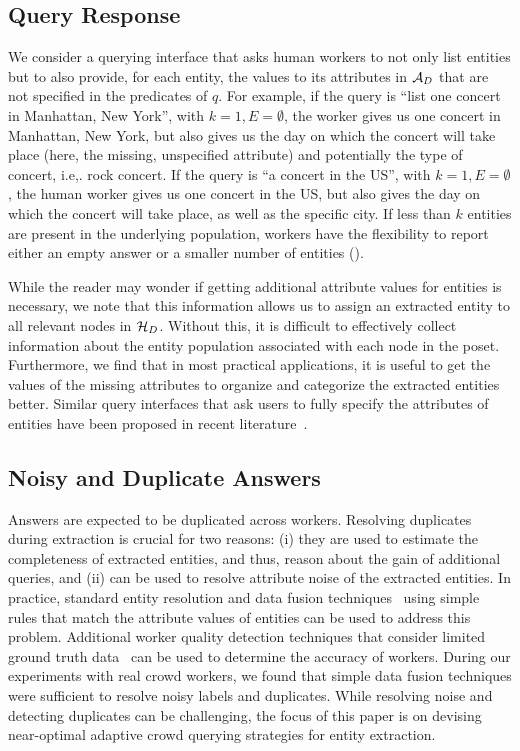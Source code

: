 \subsection{Query Response} 
We consider a querying interface that asks human workers to not only list entities but to also provide, for each entity, the values to its attributes in $\mathcal{A}_D$ that are not specified in the predicates of $q$. For example, if the query is ``list one concert in Manhattan, New York'', with $k = 1, E = \emptyset$, the worker gives us one concert in Manhattan, New York, but also gives us the day on which the concert will take place (here, the missing, unspecified attribute) and potentially the type of concert, i.e,. rock concert. If the query is ``a concert in the US'', with $k = 1, E = \emptyset$, the human worker gives us one concert in the US, but also gives the day on which the concert will take place, as well as the specific city. If less than $k$ entities are present in the underlying population, workers have the flexibility to report either an empty answer or a smaller number of entities ().

While the reader may wonder if getting additional attribute values for entities is necessary, we note that this information allows us to assign an extracted entity to all relevant nodes in $\mathcal{H}_D$. Without this, it is difficult to effectively collect information about the entity population associated with each node in the poset. Furthermore, we find that in most practical applications, it is useful to get the values of the missing attributes to organize and categorize the extracted entities better. Similar query interfaces that ask users to fully specify the attributes of entities have been proposed in recent literature~\cite{quinn:2014}. 

\subsection{Noisy and Duplicate Answers} 
Answers are expected to be duplicated across workers. Resolving duplicates during extraction is crucial for two reasons: (i) they are used to estimate the completeness of extracted entities, and thus, reason about the gain of additional queries, and (ii) can be used to resolve attribute noise of the extracted entities. In practice, standard entity resolution and data fusion techniques~\cite{getoor:kdd13} using simple rules that match the attribute values of entities can be used to address this problem. Additional worker quality detection techniques that consider limited ground truth data~\cite{donmez-learning-inference} can be used to determine the accuracy of workers. During our experiments with real crowd workers, we found that simple data fusion techniques were sufficient to resolve noisy labels and duplicates. While resolving noise and detecting duplicates can be challenging, the focus of this paper is on devising near-optimal adaptive crowd querying strategies for entity extraction. 

